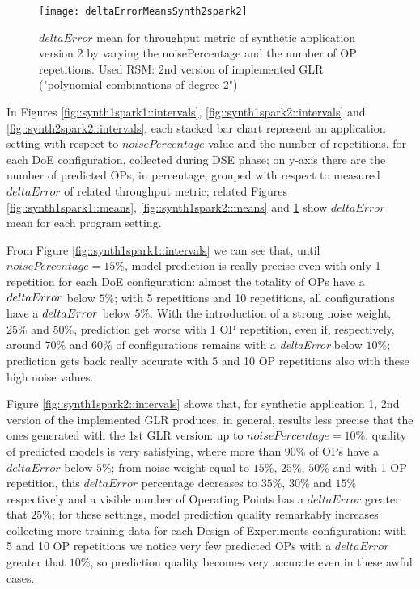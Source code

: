 \begin{figure}[htb]

    \centering
    
    \texttt{[image: deltaErrorMeansSynth2spark2]}
    
    \caption{$deltaError$ mean for throughput metric of synthetic application version 2 by varying the noisePercentage and the number of OP repetitions. Used RSM: 2nd version of implemented GLR ("polynomial combinations of degree 2")}
    
    \label{fig::synth2spark2::means}
    
\end{figure}





In Figures \ref{fig::synth1spark1::intervals}, \ref{fig::synth1spark2::intervals} and \ref{fig::synth2spark2::intervals}, each stacked bar chart represent an application setting with respect to $noisePercentage$ value and the number of repetitions, for each DoE configuration, collected during DSE phase; on y-axis there are the number of predicted OPs, in percentage, grouped with respect to measured $deltaError$ of related throughput metric; related Figures \ref{fig::synth1spark1::means}, \ref{fig::synth1spark2::means} and \ref{fig::synth2spark2::means} show $deltaError$ mean for each program setting.

From Figure \ref{fig::synth1spark1::intervals} we can see that, until $noisePercentage = 15\%$, model prediction is really precise even with only 1 repetition for each DoE configuration: almost the totality of OPs have a $del\-ta\-Er\-ror$ below $5\%$; with 5 repetitions and 10 repetitions, all configurations have a $del\-ta\-Er\-ror$ below $5\%$. With the introduction of a strong noise weight, $25\%$ and $50\%$, prediction get worse with 1 OP repetition, even if, respectively, around $70\%$ and $60\%$ of configurations remains with a \textit{deltaError} below $10\%$; prediction gets back really accurate with 5 and 10 OP repetitions also with these high noise values.

Figure \ref{fig::synth1spark2::intervals} shows that, for synthetic application 1, 2nd version of the implemented GLR produces, in general, results less precise that the ones generated with the 1st GLR version: up to $noisePercentage = 10\%$, quality of predicted models is very satisfying, where more than $90\%$ of OPs have a $deltaError$ below $5\%$; from noise weight equal to $15\%$, $25\%$, $50\%$ and with 1 OP repetition, this $deltaError$ percentage decreases to $35\%$, $30\%$ and $15\%$ respectively and a visible number of Operating Points has a $deltaError$ greater that $25\%$; for these settings, model prediction quality remarkably increases collecting more training data for each Design of Experiments configuration: with 5 and 10 OP repetitions we notice very few predicted OPs with a $deltaError$ greater that $10\%$, so prediction quality becomes very accurate even in these awful cases.

